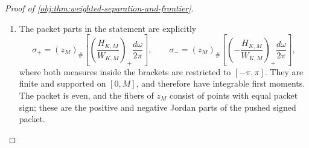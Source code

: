 \documentclass[11pt]{article}
\begin{document}
\begin{proof}[Proof of \cref{obj:thm:weighted-separation-and-frontier}]
\begin{enumerate}
We next verify the normalization over the whole parameter range. The nonnegative Jackson kernel has a strict maximum at the periodic origin: the geometric-sum representation of \(D_N\) gives
\[
|D_N(\omega)|<N
\quad\text{when }\cos\omega<1,
\qquad
|D_N(0)|=N.
\]
Since \(\cos(2\vartheta_M)<1\),
\[
H_{K,M}(\vartheta_M)
=\mathcal J_N(0)
 +\mathcal J_N(2\vartheta_M)\cos(8N\vartheta_M)
\ge\mathcal J_N(0)-\mathcal J_N(2\vartheta_M)>0.
\]
Continuity and nonnegativity of the integrand defining \(W_{K,M}\) therefore give \(W_{K,M}>0\).

For the upper bound, use
\[
|H_{K,M}(\omega)|
\le
\mathcal J_N(\omega-\vartheta_M)
+\mathcal J_N(\omega+\vartheta_M)
\]
and the identity
\[
z_M(\omega+\vartheta_M)+z_M(\omega-\vartheta_M)
=2+(M-2)(1-\cos\omega).
\]
After translating the two periodic integrals,
\[
\begin{aligned}
W_{K,M}
&\le
\int_{-\pi}^{\pi}
\{4+(M-2)(1-\cos\omega)\}J_N^{\mathrm J}(\omega)\,d\omega\\
&\le
4+\frac{M-2}{2}
 \int_{-\pi}^{\pi}\omega^2J_N^{\mathrm J}(\omega)\,d\omega\\
&\le4+\frac{32(M-2)}{N^2}
\le36.
\end{aligned}
\]
Define
\[
c_{\mathrm p}=\frac{c_{\mathrm{loc}}}{576\pi A_0}>0.
\]
Dividing the packet response by \(W_{K,M}\le36\) proves
\[
\left|
\int_{-\pi}^{\pi}
\phi_\epsilon\{z_M(\omega)\}
\frac{H_{K,M}(\omega)}{W_{K,M}}\,
\frac{d\omega}{2\pi}
\right|
\ge c_{\mathrm p}\frac{\sqrt M}{K}.
\]

\item
The packet parts in the statement are explicitly
\[
\sigma_+
=(z_M)_\#
\left[
\left(\frac{H_{K,M}}{W_{K,M}}\right)_+
\frac{d\omega}{2\pi}
\right],
\qquad
\sigma_-
=(z_M)_\#
\left[
\left(-\frac{H_{K,M}}{W_{K,M}}\right)_+
\frac{d\omega}{2\pi}
\right],
\]
where both measures inside the brackets are restricted to
\([-\pi,\pi]\). They are finite and supported on \([0,M]\), and therefore have integrable first moments. The packet is even, and the fibers of \(z_M\) consist of points with equal packet sign; these are the positive and negative Jordan parts of the pushed signed packet.


\end{enumerate}
\end{proof}
\end{document}
